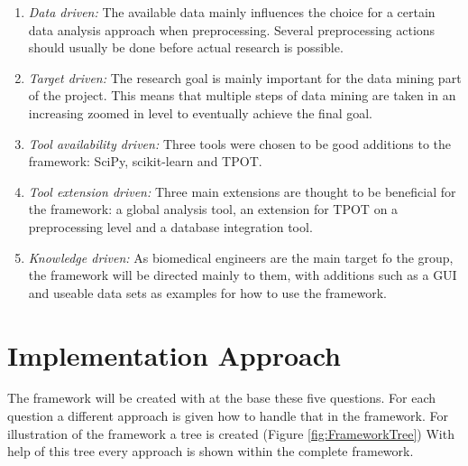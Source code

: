 \documentclass[10pt,a4paper]{article}
\begin{document}
	\begin{enumerate}
		
		\item[] \textit{Data driven:} The available data mainly influences the choice for a certain data analysis approach when preprocessing. Several preprocessing actions should usually be done before actual research is possible.
		
		\item[] \textit{Target driven:} The research goal is mainly important for the data mining part of the project. This means that multiple steps of data mining are taken in an increasing zoomed in level to eventually achieve the final goal.
		
		\item[] \textit{Tool availability driven:} Three tools were chosen to be good additions to the framework: SciPy, scikit-learn and TPOT.
		
		\item[] \textit{Tool extension driven:} Three main extensions are thought to be beneficial for the framework: a global analysis tool, an extension for TPOT on a preprocessing level and a database integration tool.
		
		\item[] \textit{Knowledge driven:} As biomedical engineers are the main target fo the group, the framework will be directed mainly to them, with additions such as a GUI and useable data sets as examples for how to use the framework.
		
	\end{enumerate}
	
	\section{Implementation Approach}
	\label{sec:Approach}
	
	The framework will be created with at the base these five questions. For each question a different approach is given how to handle that in the framework. For illustration of the framework a tree is created (Figure \ref{fig:FrameworkTree}) With help of this tree every approach is shown within the complete framework.
	
\end{document}
